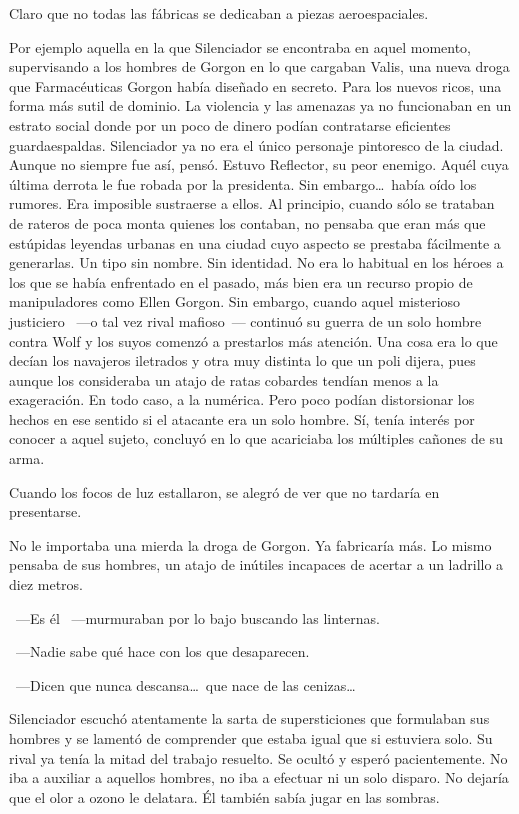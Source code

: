 Claro que no todas las fábricas se dedicaban a piezas aeroespaciales.

Por ejemplo aquella en la que Silenciador se encontraba en aquel momento, supervisando a los hombres de Gorgon en lo que cargaban Valis, una nueva droga que Farmacéuticas Gorgon había diseñado en secreto. Para los nuevos ricos, una forma más sutil de dominio. La violencia y las amenazas ya no funcionaban en un estrato social donde por un poco de dinero podían contratarse eficientes guardaespaldas. Silenciador ya no era el único personaje pintoresco de la ciudad. Aunque no siempre fue así, pensó. Estuvo Reflector, su peor enemigo. Aquél cuya última derrota le fue robada por la presidenta. Sin embargo\dots\ había oído los rumores. Era imposible sustraerse a ellos. Al principio, cuando sólo se trataban de rateros de poca monta quienes los contaban, no pensaba que eran más que estúpidas leyendas urbanas en una ciudad cuyo aspecto se prestaba fácilmente a generarlas. Un tipo sin nombre. Sin identidad. No era lo habitual en los héroes a los que se había enfrentado en el pasado, más bien era un recurso propio de manipuladores como Ellen Gorgon. Sin embargo, cuando aquel misterioso justiciero ~---o tal vez rival mafioso~--- continuó su guerra de un solo hombre contra Wolf y los suyos comenzó a prestarlos más atención. Una cosa era lo que decían los navajeros iletrados y otra muy distinta lo que un poli dijera, pues aunque los consideraba un atajo de ratas cobardes tendían menos a la exageración. En todo caso, a la numérica. Pero poco podían distorsionar los hechos en ese sentido si el atacante era un solo hombre. Sí, tenía interés por conocer a aquel sujeto, concluyó en lo que acariciaba los múltiples cañones de su arma.

Cuando los focos de luz estallaron, se alegró de ver que no tardaría en presentarse.

No le importaba una mierda la droga de Gorgon. Ya fabricaría más. Lo mismo pensaba de sus hombres, un atajo de inútiles incapaces de acertar a un ladrillo a diez metros.

~---Es él ~---murmuraban por lo bajo buscando las linternas.

~---Nadie sabe qué hace con los que desaparecen.

~---Dicen que nunca descansa\dots\ que nace de las cenizas\dots

Silenciador escuchó atentamente la sarta de supersticiones que formulaban sus hombres y se lamentó de comprender que estaba igual que si estuviera solo. Su rival ya tenía la mitad del trabajo resuelto. Se ocultó y esperó pacientemente. No iba a auxiliar a aquellos hombres, no iba a efectuar ni un solo disparo. No dejaría que el olor a ozono le delatara. Él también sabía jugar en las sombras.

